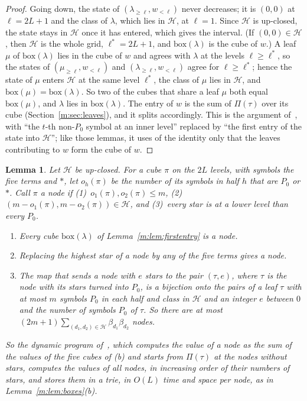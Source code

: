 \documentclass[11pt]{article}
\newtheorem{lemma}[theorem]{Lemma}
\theoremstyle{definition}
\theoremstyle{remark}
\begin{document}
\begin{proof}
Going down, the state of $(\lambda_{\ge\ell},w_{<\ell})$ never decreases; it is $(0,0)$ at $\ell=2L+1$ and the class of $\lambda$, which lies in $\mathcal H$, at $\ell=1$. Since $\mathcal H$ is up-closed, the state stays in $\mathcal H$ once it has entered, which gives the interval. (If $(0,0)\in\mathcal H$, then $\mathcal H$ is the whole grid, $\ell^*=2L+1$, and $\mathrm{box}(\lambda)$ is the cube of $w$.) A leaf $\mu$ of $\mathrm{box}(\lambda)$ lies in the cube of $w$ and agrees with $\lambda$ at the levels $\ell\ge\ell^*$, so the states of $(\mu_{\ge\ell},w_{<\ell})$ and $(\lambda_{\ge\ell},w_{<\ell})$ agree for $\ell\ge\ell^*$; hence the state of $\mu$ enters $\mathcal H$ at the same level $\ell^*$, the class of $\mu$ lies in $\mathcal H$, and $\mathrm{box}(\mu)=\mathrm{box}(\lambda)$. So two of the cubes that share a leaf $\mu$ both equal $\mathrm{box}(\mu)$, and $\lambda$ lies in $\mathrm{box}(\lambda)$. The entry of $w$ is the sum of $\Pi(\tau)$ over its cube (Section~\ref{m:sec:leaves}), and it splits accordingly. This is the argument of~\cite[Lemmas 27 and 28]{ZT}, with ``the $t$-th non-$P_0$ symbol at an inner level'' replaced by ``the first entry of the state into $\mathcal H$''; like those lemmas, it uses of the identity only that the leaves contributing to $w$ form the cube of $w$.
\end{proof}

\begin{lemma}\label{m:lem:nodes}
Let $\mathcal H$ be up-closed. For a cube $\pi$ on the $2L$ levels, with symbols the five terms and $\ast$, let $o_h(\pi)$ be the number of its symbols in half $h$ that are $P_0$ or $\ast$. Call $\pi$ a \emph{node} if (1)~$o_1(\pi),o_2(\pi)\le m$, (2)~$(m-o_1(\pi),m-o_2(\pi))\in\mathcal H$, and (3)~every star is at a lower level than every $P_0$.
\begin{enumerate}[label=(\alph*),nosep]
\item Every cube $\mathrm{box}(\lambda)$ of Lemma~\ref{m:lem:firstentry} is a node.
\item Replacing the highest star of a node by any of the five terms gives a node.
\item The map that sends a node with $e$ stars to the pair $(\tau,e)$, where $\tau$ is the node with its stars turned into $P_0$, is a bijection onto the pairs of a leaf $\tau$ with at most $m$ symbols $P_0$ in each half and class in $\mathcal H$ and an integer $e$ between $0$ and the number of symbols $P_0$ of $\tau$. So there are at most $(2m+1)\sum_{(d_1,d_2)\in\mathcal H}\beta_{d_1}\beta_{d_2}$ nodes.
\end{enumerate}
So the dynamic program of~\cite[Lemma 29]{ZT}, which computes the value of a node as the sum of the values of the five cubes of (b) and starts from $\Pi(\tau)$ at the nodes without stars, computes the values of all nodes, in increasing order of their numbers of stars, and stores them in a trie, in $O(L)$ time and space per node, as in Lemma~\ref{m:lem:boxes}(b).
\end{lemma}
\end{document}
